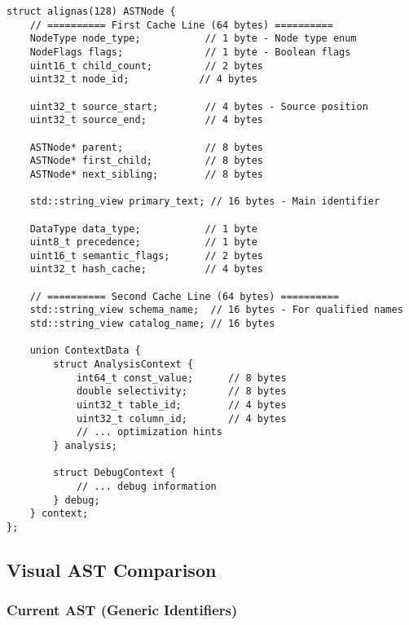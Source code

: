 \documentclass[11pt,a4paper]{article}
\begin{document}
\begin{lstlisting}[style=cpp]
struct alignas(128) ASTNode {
    // ========== First Cache Line (64 bytes) ==========
    NodeType node_type;           // 1 byte - Node type enum
    NodeFlags flags;              // 1 byte - Boolean flags
    uint16_t child_count;         // 2 bytes
    uint32_t node_id;            // 4 bytes
    
    uint32_t source_start;        // 4 bytes - Source position
    uint32_t source_end;          // 4 bytes
    
    ASTNode* parent;              // 8 bytes
    ASTNode* first_child;         // 8 bytes
    ASTNode* next_sibling;        // 8 bytes
    
    std::string_view primary_text; // 16 bytes - Main identifier
    
    DataType data_type;           // 1 byte
    uint8_t precedence;           // 1 byte
    uint16_t semantic_flags;      // 2 bytes
    uint32_t hash_cache;          // 4 bytes
    
    // ========== Second Cache Line (64 bytes) ==========
    std::string_view schema_name;  // 16 bytes - For qualified names
    std::string_view catalog_name; // 16 bytes
    
    union ContextData {
        struct AnalysisContext {
            int64_t const_value;      // 8 bytes
            double selectivity;       // 8 bytes
            uint32_t table_id;        // 4 bytes
            uint32_t column_id;       // 4 bytes
            // ... optimization hints
        } analysis;
        
        struct DebugContext {
            // ... debug information
        } debug;
    } context;
};
\end{lstlisting}

\subsection{Visual AST Comparison}

\subsubsection{Current AST (Generic Identifiers)}
\end{document}
